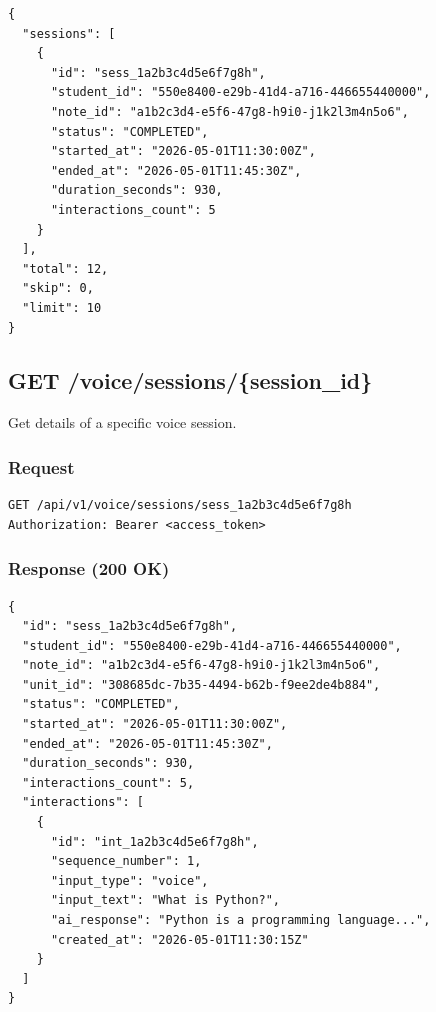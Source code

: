 \documentclass[12pt,a4paper,oneside]{article}
\begin{document}
\begin{lstlisting}
{
  "sessions": [
    {
      "id": "sess_1a2b3c4d5e6f7g8h",
      "student_id": "550e8400-e29b-41d4-a716-446655440000",
      "note_id": "a1b2c3d4-e5f6-47g8-h9i0-j1k2l3m4n5o6",
      "status": "COMPLETED",
      "started_at": "2026-05-01T11:30:00Z",
      "ended_at": "2026-05-01T11:45:30Z",
      "duration_seconds": 930,
      "interactions_count": 5
    }
  ],
  "total": 12,
  "skip": 0,
  "limit": 10
}
\end{lstlisting}

\subsection{GET /voice/sessions/\{session\_id\}}

Get details of a specific voice session.

\subsubsection{Request}

\begin{lstlisting}
GET /api/v1/voice/sessions/sess_1a2b3c4d5e6f7g8h
Authorization: Bearer <access_token>
\end{lstlisting}

\subsubsection{Response (200 OK)}

\begin{lstlisting}
{
  "id": "sess_1a2b3c4d5e6f7g8h",
  "student_id": "550e8400-e29b-41d4-a716-446655440000",
  "note_id": "a1b2c3d4-e5f6-47g8-h9i0-j1k2l3m4n5o6",
  "unit_id": "308685dc-7b35-4494-b62b-f9ee2de4b884",
  "status": "COMPLETED",
  "started_at": "2026-05-01T11:30:00Z",
  "ended_at": "2026-05-01T11:45:30Z",
  "duration_seconds": 930,
  "interactions_count": 5,
  "interactions": [
    {
      "id": "int_1a2b3c4d5e6f7g8h",
      "sequence_number": 1,
      "input_type": "voice",
      "input_text": "What is Python?",
      "ai_response": "Python is a programming language...",
      "created_at": "2026-05-01T11:30:15Z"
    }
  ]
}
\end{lstlisting}

\newpage

\end{document}
